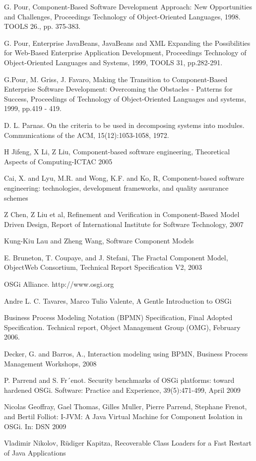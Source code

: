 \begin{thebibliography}{99}

 G. Pour, Component-Based Software Development Approach: New Opportunities and Challenges, Proceedings Technology of Object-Oriented Languages, 1998. TOOLS 26., pp. 375-383.

  G. Pour,  Enterprise JavaBeans,  JavaBeans and XML Expanding the Possibilities for Web-Based Enterprise Application Development,  Proceedings Technology of Object-Oriented Languages and Systems, 1999, TOOLS 31, pp.282-291.

 G.Pour, M. Griss, J. Favaro, Making the Transition to Component-Based Enterprise Software Development: Overcoming the Obstacles - Patterns for Success, Proceedings of Technology of Object-Oriented Languages and systems, 1999, pp.419 - 419.

 D. L. Parnas. On the criteria to be used in decomposing systems into modules. Communications of the ACM, 15(12):1053-1058, 1972.

 H Jifeng, X Li, Z Liu, Component-based software engineering, Theoretical Aspects of Computing-ICTAC 2005

 Cai, X. and Lyu, M.R. and Wong, K.F. and Ko, R, Component-based software engineering: technologies, development frameworks, and quality assurance schemes

 Z Chen, Z Liu et al, Refinement and Verification in Component-Based Model Driven Design, Report of International Institute for Software Technology, 2007

 Kung-Kiu Lau and Zheng Wang, Software Component Models

 E. Bruneton, T. Coupaye, and J. Stefani, The Fractal Component Model, ObjectWeb Consortium, Technical Report Specification V2, 2003

 OSGi Alliance. http://www.osgi.org 

 Andre L. C. Tavares, Marco Tulio Valente, A Gentle Introduction to OSGi

 Business Process Modeling Notation (BPMN) Specification, Final Adopted Specification. Technical report, Object Management Group (OMG), February 2006.

 Decker, G. and Barros, A., Interaction modeling using BPMN, Business Process Management Workshops, 2008

 P. Parrend and S. Fr´enot. Security benchmarks of OSGi platforms: toward hardened OSGi. Software: Practice and Experience, 39(5):471-499, April 2009

 Nicolas Geoffray, Gael Thomas, Gilles Muller, Pierre Parrend, Stephane Frenot, and Bertil Folliot: I-JVM: A Java Virtual Machine for Component Isolation in OSGi. In: DSN 2009

 Vladimir Nikolov, Rüdiger Kapitza, Recoverable Class Loaders for a Fast Restart of
Java Applications
 

\end{thebibliography}